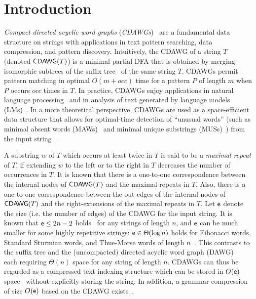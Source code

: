 \section{Introduction}

\emph{Compact directed acyclic word graphs} (\emph{CDAWGs})~\cite{Blumer1987} are a fundamental data structure on strings with applications in text pattern searching, data compression, and pattern discovery.
Intuitively, the CDAWG of a string $T$ (denoted $\mathsf{CDAWG}(T)$) is a minimal partial DFA that is obtained by merging isomorphic subtrees of the suffix tree~\cite{Weiner1973} of the same string $T$.
CDAWGs permit pattern matching in optimal $O(m + occ)$ time
for a pattern $P$ of length $m$ when $P$ occurs $occ$ times in $T$.
In practice, CDAWGs enjoy applications in natural language processing~\cite{Takeda2000} and in analysis of text generated by language models (LMs)~\cite{MerrillSE24}.
In a more theoretical perspective, CDAWGs are used as a space-efficient data structure that allows for optimal-time detection of ``unusual words'' (such as minimal absent words (MAWs)~\cite{Crochemore1998MAWdefinition} and minimal unique substrings (MUSs)~\cite{Ilie2011MUS}) from the input string~\cite{BelazzouguiC17,InenagaMAFF24,MienoI25}.

A substring $w$ of $T$ which occurs at least twice in $T$ is said to be a \emph{maximal repeat} of $T$,
if extending $w$ to the left or to the right in $T$ decreases
the number of occurrences in $T$.
It is known that there is a one-to-one correspondence between the internal nodes of $\mathsf{CDAWG}(T)$ and the maximal repeats in $T$.
Also, there is a one-to-one correspondence between the out-edges of
the internal nodes of $\mathsf{CDAWG}(T)$ and
the right-extensions of the maximal repeats in $T$.
Let $\mathsf{e}$ denote the size (i.e. the number of edges) of
the CDAWG for the input string.
It is known that $\mathsf{e} \leq 2n-2$ holds~\cite{Blumer1987} for any strings of length $n$,
and $\mathsf{e}$ can be much smaller for some highly repetitive strings:
$\mathsf{e} \in \Theta(\log n)$ holds for
Fibonacci words, Standard Sturmian words, and Thue-Morse words of length $n$~\cite{Rytter06,BaturoPR09,RadoszewskiR12}.
This contrasts to the suffix tree and the (uncompacted) directed acyclic word graph (DAWG)~\cite{Blumer1985} each requiring $\Theta(n)$ space
for any string of length $n$.
CDAWGs can thus be regarded as a compressed text indexing structure
which can be stored in $O(\mathsf{e})$ space~\cite{BelazzouguiC17,Inenaga24} without explicitly storing the string.
In addition, a grammar compression of size $O(\mathsf{e})$
based on the CDAWG exists~\cite{BelazzouguiC17}.

